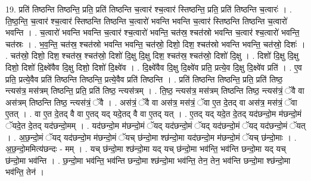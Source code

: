 \documentclass[17pt]{extarticle}
\begin{document}
19. प्रति॑ तिष्ठन्ति तिष्ठन्ति॒ प्रति॒ प्रति॑ तिष्ठन्ति च॒त्वार॑ श्च॒त्वार॑ स्तिष्ठन्ति॒ प्रति॒ प्रति॑ तिष्ठन्ति च॒त्वारः॑ । . ति॒ष्ठ॒न्ति॒ च॒त्वार॑ श्च॒त्वार॑ स्तिष्ठन्ति तिष्ठन्ति च॒त्वारो॑ भवन्ति भवन्ति च॒त्वार॑ स्तिष्ठन्ति तिष्ठन्ति च॒त्वारो॑ भवन्ति । . च॒त्वारो॑ भवन्ति भवन्ति च॒त्वार॑ श्च॒त्वारो॑ भवन्ति॒ चत॑स्र॒ श्चत॑स्रो भवन्ति च॒त्वार॑ श्च॒त्वारो॑ भवन्ति॒ चत॑स्रः । . भ॒व॒न्ति॒ चत॑स्र॒ श्चत॑स्रो भवन्ति भवन्ति॒ चत॑स्रो॒ दिशो॒ दिश॒ श्चत॑स्रो भवन्ति भवन्ति॒ चत॑स्रो॒ दिशः॑ । . चत॑स्रो॒ दिशो॒ दिश॒ श्चत॑स्र॒ श्चत॑स्रो॒ दिशो॑ दि॒क्षु दि॒क्षु दिश॒ श्चत॑स्र॒ श्चत॑स्रो॒ दिशो॑ दि॒क्षु । . दिशो॑ दि॒क्षु दि॒क्षु दिशो॒ दिशो॑ दि॒क्ष्वे॑वैव दि॒क्षु दिशो॒ दिशो॑ दि॒क्ष्वे॑व । . दि॒क्ष्वे॑वैव दि॒क्षु दि॒क्ष्वे॑व प्रति॒ प्रत्ये॒व दि॒क्षु दि॒क्ष्वे॑व प्रति॑ । . ए॒व प्रति॒ प्रत्ये॒वैव प्रति॑ तिष्ठन्ति तिष्ठन्ति॒ प्रत्ये॒वैव प्रति॑ तिष्ठन्ति । . प्रति॑ तिष्ठन्ति तिष्ठन्ति॒ प्रति॒ प्रति॑ तिष्ठ॒ न्त्यस॑त्र॒ मस॑त्रम् तिष्ठन्ति॒ प्रति॒ प्रति॑ तिष्ठ॒ न्त्यस॑त्रम् । . ति॒ष्ठ॒ न्त्यस॑त्र॒ मस॑त्रम् तिष्ठन्ति तिष्ठ॒ न्त्यस॑त्रं॒ ॅवै वा अस॑त्रम् तिष्ठन्ति तिष्ठ॒ न्त्यस॑त्रं॒ ॅवै । . अस॑त्रं॒ ॅवै वा अस॑त्र॒ मस॑त्रं॒ ॅवा ए॒त दे॒तद् वा अस॑त्र॒ मस॑त्रं॒ ॅवा ए॒तत् । . वा ए॒त दे॒तद् वै वा ए॒तद् यद् यदे॒तद् वै वा ए॒तद् यत् । . ए॒तद् यद् यदे॒त दे॒तद् यद॑छन्दो॒म म॑छन्दो॒मं ॅयदे॒त दे॒तद् यद॑छन्दो॒मम् । . यद॑छन्दो॒म म॑छन्दो॒मं ॅयद् यद॑छन्दो॒मं ॅयद् यद॑छन्दो॒मं ॅयद् यद॑छन्दो॒मं ॅयत् । . अ॒छ॒न्दो॒मं ॅयद् यद॑छन्दो॒म म॑छन्दो॒मं ॅयच् छ॑न्दो॒मा श्छ॑न्दो॒मा यद॑छन्दो॒म म॑छन्दो॒मं ॅयच् छ॑न्दो॒माः । . अ॒छ॒न्दो॒ममित्य॑छन्दः - मम् । . यच् छ॑न्दो॒मा श्छ॑न्दो॒मा यद् यच् छ॑न्दो॒मा भव॑न्ति॒ भव॑न्ति छन्दो॒मा यद् यच् छ॑न्दो॒मा भव॑न्ति । . छ॒न्दो॒मा भव॑न्ति॒ भव॑न्ति छन्दो॒मा श्छ॑न्दो॒मा भव॑न्ति॒ तेन॒ तेन॒ भव॑न्ति छन्दो॒मा श्छ॑न्दो॒मा भव॑न्ति॒ तेन॑ । \newline
\end{document}
